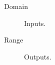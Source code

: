 \documentclass{article}
\begin{document}
\begin{description}
\item[Domain] Inputs.
\item[Range] Outputs.
\end{description}
\end{document}

